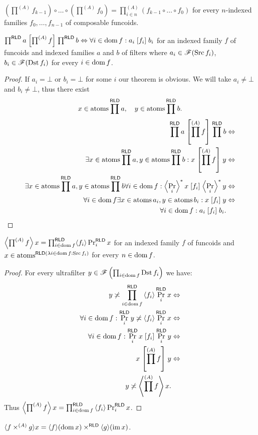 \begin{cor}
$\left(\prod^{(A)}f_{k-1}\right)\circ\ldots\circ\left(\prod^{(A)}f_{0}\right)=\prod_{i\in n}^{(A)}(f_{k-1}\circ\ldots\circ f_{0})$
for every $n$-indexed families $f_{0},\ldots,f_{n-1}$ of composable
funcoids.\end{cor}
\begin{prop}
$\prod^{\mathsf{RLD}}a\mathrel{\left[\prod^{(A)}f\right]}\prod^{\mathsf{RLD}}b\Leftrightarrow\forall i\in\operatorname{dom} f:a_{i}\mathrel{\left[f_{i}\right]}b_{i}$
for an indexed family $f$ of funcoids and indexed families $a$ and
$b$ of filters where $a_{i}\in\mathscr{F}(\operatorname{Src} f_{i})$, $b_{i}\in\mathscr{F}(\operatorname{Dst} f_{i})$
for every $i\in\operatorname{dom} f$.\end{prop}
\begin{proof}
If $a_{i}=\bot$ or $b_{i}=\bot$ for some $i$ our theorem is obvious.
We will take $a_{i}\neq\bot$ and $b_{i}\neq\bot$, thus there exist
\[
x\in\operatorname{atoms}\prod^{\mathsf{RLD}}a,\quad y\in\operatorname{atoms}\prod^{\mathsf{RLD}}b.
\]
\begin{align*}
\prod^{\mathsf{RLD}}a\mathrel{\left[\prod^{(A)}f\right]}\prod^{\mathsf{RLD}}b & \Leftrightarrow\\
\exists x\in\operatorname{atoms}\prod^{\mathsf{RLD}}a,y\in\operatorname{atoms}\prod^{\mathsf{RLD}}b:x\mathrel{\left[\prod^{(A)}f\right]}y & \Leftrightarrow\\
\exists x\in\operatorname{atoms}\prod^{\mathsf{RLD}}a,y\in\operatorname{atoms}\prod^{\mathsf{RLD}}b\forall i\in\operatorname{dom} f:\left\langle \Pr_{i}\right\rangle ^{\ast}x\mathrel{\left[f_{i}\right]}\left\langle \Pr_{i}\right\rangle ^{\ast}y & \Leftrightarrow\\
\forall i\in\operatorname{dom} f\exists x\in\operatorname{atoms} a_{i},y\in\operatorname{atoms} b_{i}:x\mathrel{\left[f_{i}\right]}y & \Leftrightarrow\\
\forall i\in\operatorname{dom} f:a_{i}\mathrel{\left[f_{i}\right]}b_{i}.
\end{align*}
\end{proof}
\begin{thm}
$\left\langle \prod^{(A)}f\right\rangle x=\prod_{i\in\operatorname{dom} f}^{\mathsf{RLD}}\langle f_{i}\rangle\Pr_{i}^{\mathsf{RLD}}x$
for an indexed family $f$ of funcoids and $x\in\operatorname{atoms}^{\mathsf{RLD}(\lambda i\in\operatorname{dom} f:\operatorname{Src} f_{i})}$
for every $n\in\operatorname{dom} f$.\end{thm}
\begin{proof}
For every ultrafilter $y\in\mathscr{F}\left(\prod_{i\in\operatorname{dom} f}\operatorname{Dst} f_{i}\right)$
we have:
\begin{align*}
y\not\asymp\prod_{i\in\operatorname{dom} f}^{\mathsf{RLD}}\left\langle f_{i}\right\rangle\Pr_{i}^{\mathsf{RLD}}x & \Leftrightarrow\\
\forall i\in\operatorname{dom} f:\Pr_{i}^{\mathsf{RLD}}y\not\asymp\left\langle f_{i}\right\rangle\Pr_{i}^{\mathsf{RLD}}x & \Leftrightarrow\\
\forall i\in\operatorname{dom} f:\Pr_{i}^{\mathsf{RLD}}x\mathrel{\left[f_{i}\right]}\Pr_{i}^{\mathsf{RLD}}y & \Leftrightarrow\\
x\mathrel{\left[\prod^{(A)}f\right]}y & \Leftrightarrow\\
y\not\asymp\left\langle \prod^{(A)}f\right\rangle x.
\end{align*}
Thus $\left\langle \prod^{(A)}f\right\rangle x=\prod_{i\in\operatorname{dom} f}^{\mathsf{RLD}}\left\langle f_{i}\right\rangle\Pr_{i}^{\mathsf{RLD}}x$.\end{proof}
\begin{cor}
$\langle f\times^{(A)}g\rangle x=\langle f\rangle(\operatorname{dom} x)\times^{\mathsf{RLD}}\langle g\rangle(\operatorname{im} x)$.
\end{cor}

